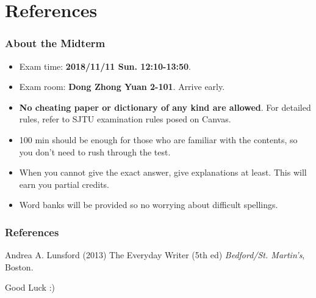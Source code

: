 \documentclass{beamer}
\begin{document}
\section{References}
\begin{frame}
\frametitle{About the Midterm}
\begin{itemize}
\item Exam time: \textbf{2018/11/11 Sun. 12:10-13:50}.
\item Exam room: \textbf{Dong Zhong Yuan 2-101}. Arrive early.
\item \textbf{No cheating paper or dictionary of any kind are allowed}. For detailed rules, refer to SJTU examination rules posed on Canvas.
\item 100 min should be enough for those who are familiar with the contents, so you don't need to rush through the test.
\item When you cannot give the exact answer, give explanations at least. This will earn you partial credits.
\item Word banks will be provided so no worrying about difficult spellings.
\end{itemize}
\end{frame}
\begin{frame}
\frametitle{References}
\footnotesize{
\begin{thebibliography}{99} %
 Andrea A. Lunsford  (2013)
\newblock The Everyday Writer (5th ed)
\newblock \emph{Bedford/St. Martin's}, Boston.

\end{thebibliography}
}
\end{frame}
\begin{frame}
\Huge{\centerline{Good Luck :)}}
\end{frame}
\end{document}
